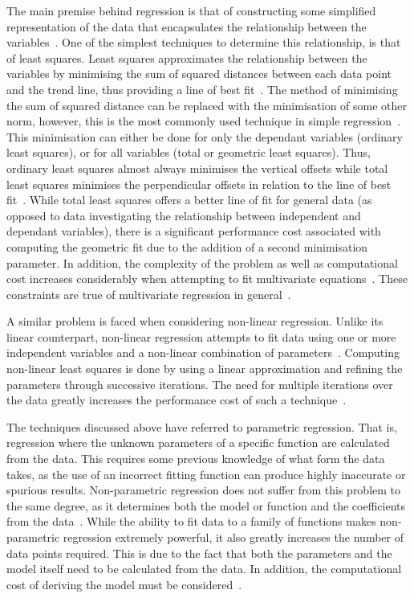 The main premise behind regression is that of constructing some simplified representation of the data that encapsulates the relationship between the variables~\citep{Syke00}. One of the simplest techniques to determine this relationship, is that of least squares. Least squares approximates the relationship between the variables by minimising the sum of squared distances between each data point and the trend line, thus providing a line of best fit~\citep{Tred02}. The method of minimising the sum of squared distance can be replaced with the minimisation of some other norm, however, this is the most commonly used technique in simple regression~\citep{Laws95}. This minimisation can either be done for only the dependant variables (ordinary least squares), or for all variables (total or geometric least squares). Thus, ordinary least squares almost always minimises the vertical offsets while total least squares minimises the perpendicular offsets in relation to the line of best fit~\citep{Laws95}. While total least squares offers a better line of fit for general data (as opposed to data investigating the relationship between independent and dependant variables), there is a significant performance cost associated with computing the geometric fit due to the addition of a second minimisation parameter. In addition, the complexity of the problem as well as computational cost increases considerably when attempting to fit multivariate equations~\citep{Laws95}. These constraints are true of multivariate regression in general~\citep{Syke00}.

A similar problem is faced when considering non-linear regression. Unlike its linear counterpart, non-linear regression attempts to fit data using one or more independent variables and a non-linear combination of parameters~\citep{Syke00}. Computing non-linear least squares is done by using a linear approximation and refining the parameters through successive iterations. The need for multiple iterations over the data greatly increases the performance cost of such a technique~\citep{Laws95}.

The techniques discussed above have referred to parametric regression. That is, regression where the unknown parameters of a specific function are calculated from the data. This requires some previous knowledge of what form the data takes, as the use of an incorrect fitting function can produce highly inaccurate or spurious results. Non-parametric regression does not suffer from this problem to the same degree, as it determines both the model or function and the coefficients from the data~\citep{Syke00}. While the ability to fit data to a family of functions makes non-parametric regression extremely powerful, it also greatly increases the number of data points required. This is due to the fact that both the parameters and the model itself need to be calculated from the data. In addition, the computational cost of deriving the model must be considered~\citep{Cord09}.

